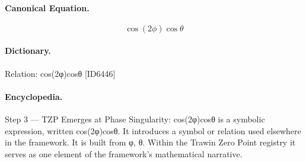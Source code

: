 \paragraph{Canonical Equation.}
\[
\cos(2\phi)\cos\theta
\]

\paragraph{Dictionary.}
Relation: cos(2φ)cosθ [ID6446]

\paragraph{Encyclopedia.}
Step 3 — TZP Emerges at Phase Singularity: cos(2φ)cosθ is a symbolic expression, written cos(2φ)cosθ. It introduces a symbol or relation used elsewhere in the framework. It is built from φ, θ. Within the Trawin Zero Point registry it serves as one element of the framework's mathematical narrative.
